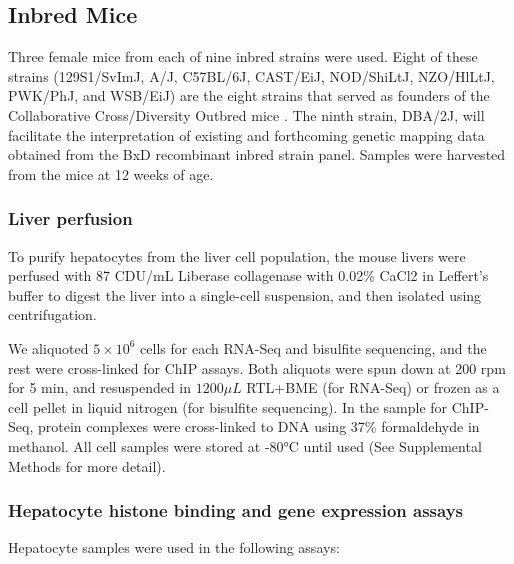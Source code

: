 \documentclass[
  11pt,
]{article}
\begin{document}
\hypertarget{inbred-mice}{%
\subsection{Inbred Mice}\label{inbred-mice}}

Three female mice from each of nine inbred strains were used. Eight of
these strains (129S1/SvImJ, A/J, C57BL/6J, CAST/EiJ, NOD/ShiLtJ,
NZO/HlLtJ, PWK/PhJ, and WSB/EiJ) are the eight strains that served as
founders of the Collaborative Cross/Diversity Outbred mice
\citep{Chesler:2008ge}. The ninth strain, DBA/2J, will facilitate the
interpretation of existing and forthcoming genetic mapping data obtained
from the BxD recombinant inbred strain panel. Samples were harvested
from the mice at 12 weeks of age.

\hypertarget{liver-perfusion}{%
\subsubsection{Liver perfusion}\label{liver-perfusion}}

To purify hepatocytes from the liver cell population, the mouse livers
were perfused with 87 CDU/mL Liberase collagenase with 0.02\% CaCl2 in
Leffert's buffer to digest the liver into a single-cell suspension, and
then isolated using centrifugation.

We aliquoted \(5 \times 10^{6}\) cells for each RNA-Seq and bisulfite
sequencing, and the rest were cross-linked for ChIP assays. Both
aliquots were spun down at 200 rpm for 5 min, and resuspended in
\(1200\mu L\) RTL+BME (for RNA-Seq) or frozen as a cell pellet in liquid
nitrogen (for bisulfite sequencing). In the sample for ChIP-Seq, protein
complexes were cross-linked to DNA using 37\% formaldehyde in methanol.
All cell samples were stored at -80°C until used (See Supplemental
Methods for more detail).

\hypertarget{hepatocyte-histone-binding-and-gene-expression-assays}{%
\subsubsection{Hepatocyte histone binding and gene expression
assays}\label{hepatocyte-histone-binding-and-gene-expression-assays}}

Hepatocyte samples were used in the following assays:
\end{document}
